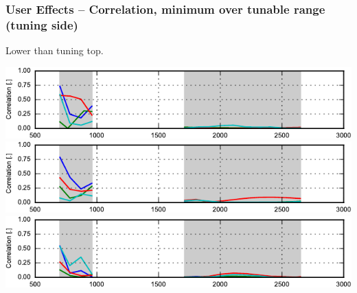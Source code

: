 \begin{frame}
    \frametitle{User Effects -- Correlation, minimum over tunable range (tuning side)}
    Lower than tuning top.
    \emptyline
    \begin{center}
        \includegraphics{img/soren/ue/design1lt/corrside.pdf}\\
        \includegraphics{img/soren/ue/design2sn/corrside.pdf}\\
        \includegraphics{img/soren/ue/design3hv/corrside.pdf}
    \end{center}
    \legendfooter
\end{frame}

